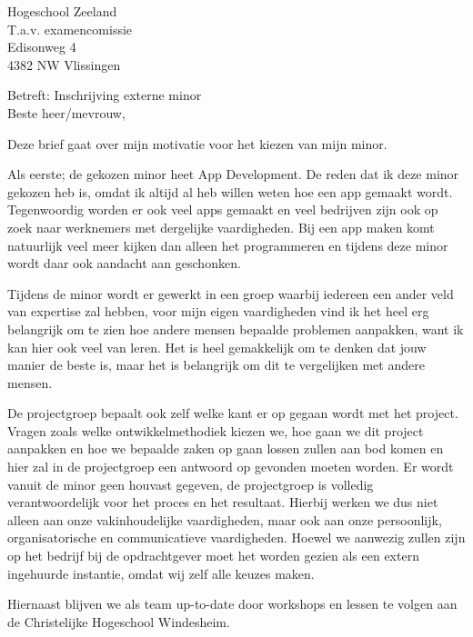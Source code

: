 \documentclass{letter}
\begin{document}

\begin{letter}{Hogeschool Zeeland \\ T.a.v. examencomissie \\ Edisonweg 4 \\ 4382 NW Vlissingen}

\opening{Betreft: Inschrijving externe minor \newline \\ Beste heer/mevrouw,}

Deze brief gaat over mijn motivatie voor het kiezen van mijn minor.

Als eerste; de gekozen minor heet App Development. De reden dat ik deze minor gekozen heb is, omdat ik altijd al heb willen weten hoe een app gemaakt wordt. Tegenwoordig worden er ook veel apps gemaakt en veel bedrijven zijn ook op zoek naar werknemers met dergelijke vaardigheden. Bij een app maken komt natuurlijk veel meer kijken dan alleen het programmeren en tijdens deze minor wordt daar ook aandacht aan geschonken.

\newline

Tijdens de minor wordt er gewerkt in een groep waarbij iedereen een ander veld van expertise zal hebben, voor mijn eigen vaardigheden vind ik het heel erg belangrijk om te zien hoe andere mensen bepaalde problemen aanpakken, want ik kan hier ook veel van leren. Het is heel gemakkelijk om te denken dat jouw manier de beste is, maar het is belangrijk om dit te vergelijken met andere mensen. 

De projectgroep bepaalt ook zelf welke kant er op gegaan wordt met het project. Vragen zoals welke ontwikkelmethodiek kiezen we, hoe gaan we dit project aanpakken en hoe we bepaalde zaken op gaan lossen zullen aan bod komen en hier zal in de projectgroep een antwoord op gevonden moeten worden. Er wordt vanuit de minor geen houvast gegeven, de projectgroep is volledig verantwoordelijk voor het proces en het resultaat. Hierbij werken we dus niet alleen aan onze vakinhoudelijke vaardigheden, maar ook aan onze persoonlijk, organisatorische en communicatieve vaardigheden. Hoewel we aanwezig zullen zijn op het bedrijf bij de opdrachtgever moet het worden gezien als een extern ingehuurde instantie, omdat wij zelf alle keuzes maken. 

Hiernaast blijven we als team up-to-date door workshops en lessen te volgen aan de Christelijke Hogeschool Windesheim.


\end{letter}
\end{document}
